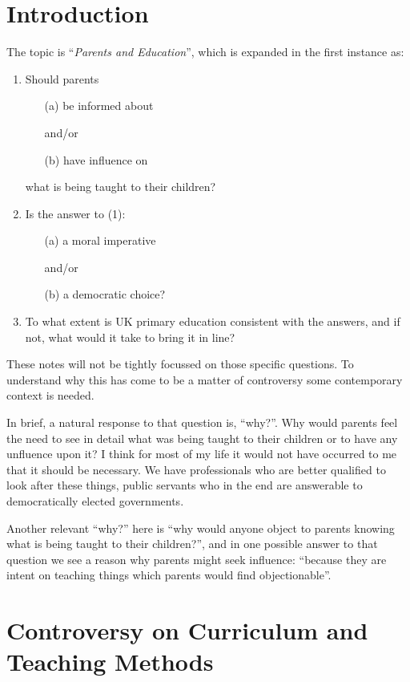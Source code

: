 \documentclass[10pt,titlepage]{book}
\begin{document}
\section{Introduction}

The topic is ``\emph{Parents and Education}'', which is expanded in the first instance as:

\begin{enumerate}
\item Should parents
  \begin{itemize}
  \item[(a)] be informed about

    and/or
  \item[(b)] have influence on
    \end{itemize}
what is being taught to their children?

\item Is the answer to (1):
  \begin{itemize}
  \item[(a)] a moral imperative

    and/or
    \item[(b)] a democratic choice?
  \end{itemize}
\item To what extent is UK primary education consistent with the answers,
and if not, what would it take to bring it in line?
\end{enumerate}

These notes will not be tightly focussed on those specific questions.
To understand why this has come to be a matter of controversy some contemporary context is needed.

In brief, a natural response to that question is, ``why?''.
Why would parents feel the need to see in detail what was being taught to their children or to have any unfluence upon it?
I think for most of my life it would not have occurred to me that it should be necessary.
We have professionals who are better qualified to look after these things, public servants who in the end are answerable to democratically elected governments.

Another relevant ``why?'' here is ``why would anyone object to parents knowing what is being taught to their children?'', and in one possible answer to that question we see a reason why parents might seek influence: ``because they are intent on teaching things which parents would find objectionable''.


\section{Controversy on Curriculum and Teaching Methods}
\end{document}
